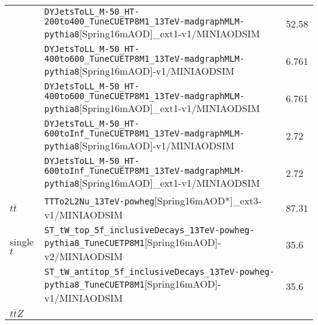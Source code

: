 \begin{table}
\begin{tabular}{l|l|l}
                            & \verb /DYJetsToLL_M-50_HT-200to400_TuneCUETP8M1_13TeV-madgraphMLM-pythia8/[Spring16mAOD]_ext1-v1/MINIAODSIM                     & 52.58 \\
                            & \verb /DYJetsToLL_M-50_HT-400to600_TuneCUETP8M1_13TeV-madgraphMLM-pythia8/[Spring16mAOD]-v1/MINIAODSIM                          & 6.761 \\
                            & \verb /DYJetsToLL_M-50_HT-400to600_TuneCUETP8M1_13TeV-madgraphMLM-pythia8/[Spring16mAOD]_ext1-v1/MINIAODSIM                     & 6.761 \\
                            & \verb /DYJetsToLL_M-50_HT-600toInf_TuneCUETP8M1_13TeV-madgraphMLM-pythia8/[Spring16mAOD]-v1/MINIAODSIM                          & 2.72 \\
                            & \verb /DYJetsToLL_M-50_HT-600toInf_TuneCUETP8M1_13TeV-madgraphMLM-pythia8/[Spring16mAOD]_ext1-v1/MINIAODSIM                     & 2.72 \\
     $t\bar{t}$       %
                            & \verb /TTTo2L2Nu_13TeV-powheg/[Spring16mAOD*]_ext3-v1/MINIAODSIM						                      & 87.31 \\
     single $t$             & \verb /ST_tW_top_5f_inclusiveDecays_13TeV-powheg-pythia8_TuneCUETP8M1/[Spring16mAOD]-v2/MINIAODSIM			      & 35.6 \\
                            & \verb /ST_tW_antitop_5f_inclusiveDecays_13TeV-powheg-pythia8_TuneCUETP8M1/[Spring16mAOD]-v1/MINIAODSIM                          & 35.6 \\
     $t\bar{t}Z$      %

\end{tabular}
\end{table}
